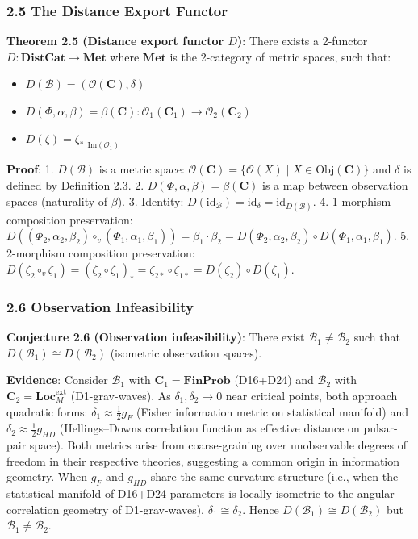 \documentclass[
]{article}
\providecommand{\tightlist}{%
  \setlength{\itemsep}{0pt}\setlength{\parskip}{0pt}}
\begin{document}
\subsubsection{2.5 The Distance Export
Functor}\label{the-distance-export-functor}

\textbf{Theorem 2.5 (Distance export functor \(D\))}: There exists a
2-functor \(D: \mathbf{DistCat} \to \mathbf{Met}\) where
\(\mathbf{Met}\) is the 2-category of metric spaces, such that:

\begin{itemize}
\tightlist
\item
  \(D(\mathcal{B}) = (\mathcal{O}(\mathbf{C}), \delta)\)
\item
  \(D(\Phi, \alpha, \beta) = \beta(\mathbf{C}): \mathcal{O}_1(\mathbf{C}_1) \to \mathcal{O}_2(\mathbf{C}_2)\)
\item
  \(D(\zeta) = \zeta_*|_{\text{Im}(\mathcal{O}_1)}\)
\end{itemize}

\textbf{Proof}: 1. \(D(\mathcal{B})\) is a metric space:
\(\mathcal{O}(\mathbf{C}) = \{\mathcal{O}(X) \mid X \in \text{Obj}(\mathbf{C})\}\)
and \(\delta\) is defined by Definition 2.3. 2.
\(D(\Phi, \alpha, \beta) = \beta(\mathbf{C})\) is a map between
observation spaces (naturality of \(\beta\)). 3. Identity:
\(D(\text{id}_{\mathcal{B}}) = \text{id}_{\delta} = \text{id}_{D(\mathcal{B})}\).
4. 1-morphism composition preservation:
\(D((\Phi_2, \alpha_2, \beta_2) \circ_v (\Phi_1, \alpha_1, \beta_1)) = \beta_1 \cdot \beta_2 = D(\Phi_2, \alpha_2, \beta_2) \circ D(\Phi_1, \alpha_1, \beta_1)\).
5. 2-morphism composition preservation:
\(D(\zeta_2 \circ_v \zeta_1) = (\zeta_2 \circ \zeta_1)_* = \zeta_{2*} \circ \zeta_{1*} = D(\zeta_2) \circ D(\zeta_1)\).

\subsubsection{2.6 Observation
Infeasibility}\label{observation-infeasibility}

\textbf{Conjecture 2.6 (Observation infeasibility)}: There exist
\(\mathcal{B}_1 \neq \mathcal{B}_2\) such that
\(D(\mathcal{B}_1) \cong D(\mathcal{B}_2)\) (isometric observation
spaces).

\textbf{Evidence}: Consider \(\mathcal{B}_1\) with
\(\mathbf{C}_1 = \mathbf{FinProb}\) (D16+D24) and \(\mathcal{B}_2\) with
\(\mathbf{C}_2 = \mathbf{Loc}_M^{\text{ext}}\) (D1-grav-waves). As
\(\delta_1, \delta_2 \to 0\) near critical points, both approach
quadratic forms: \(\delta_1 \approx \frac{1}{2} g_F\) (Fisher information
metric on statistical manifold) and
\(\delta_2 \approx \frac{1}{2} g_{HD}\) (Hellings--Downs correlation
function as effective distance on pulsar-pair space). Both metrics arise
from coarse-graining over unobservable degrees of freedom in their
respective theories, suggesting a common origin in information geometry.
When \(g_F\) and \(g_{HD}\) share the same curvature structure
(i.e., when the statistical manifold of D16+D24 parameters is locally
isometric to the angular correlation geometry of D1-grav-waves),
\(\delta_1 \cong \delta_2\). Hence
\(D(\mathcal{B}_1) \cong D(\mathcal{B}_2)\) but
\(\mathcal{B}_1 \neq \mathcal{B}_2\).
\end{document}
